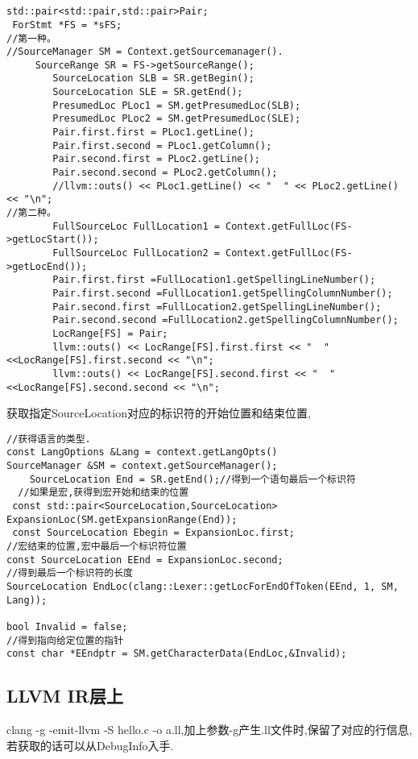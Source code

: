 \section{}

\subsection{}

\begin{lstlisting}
std::pair<std::pair,std::pair>Pair;
 ForStmt *FS = *sFS;
//第一种。
//SourceManager SM = Context.getSourcemanager().
     SourceRange SR = FS->getSourceRange();
        SourceLocation SLB = SR.getBegin();
        SourceLocation SLE = SR.getEnd();
        PresumedLoc PLoc1 = SM.getPresumedLoc(SLB);
        PresumedLoc PLoc2 = SM.getPresumedLoc(SLE);
        Pair.first.first = PLoc1.getLine();
        Pair.first.second = PLoc1.getColumn();
        Pair.second.first = PLoc2.getLine();
        Pair.second.second = PLoc2.getColumn();
        //llvm::outs() << PLoc1.getLine() << "  " << PLoc2.getLine() << "\n";
//第二种。
        FullSourceLoc FullLocation1 = Context.getFullLoc(FS->getLocStart());
        FullSourceLoc FullLocation2 = Context.getFullLoc(FS->getLocEnd());
        Pair.first.first =FullLocation1.getSpellingLineNumber();
        Pair.first.second =FullLocation1.getSpellingColumnNumber();
        Pair.second.first =FullLocation2.getSpellingLineNumber();
        Pair.second.second =FullLocation2.getSpellingColumnNumber();
        LocRange[FS] = Pair;
        llvm::outs() << LocRange[FS].first.first << "  " <<LocRange[FS].first.second << "\n";
        llvm::outs() << LocRange[FS].second.first << "  " <<LocRange[FS].second.second << "\n";
\end{lstlisting}

\par{获取指定SourceLocation对应的标识符的开始位置和结束位置,}
\begin{lstlisting}
//获得语言的类型.
const LangOptions &Lang = context.getLangOpts()
SourceManager &SM = context.getSourceManager();
    SourceLocation End = SR.getEnd();//得到一个语句最后一个标识符
  //如果是宏,获得到宏开始和结束的位置
 const std::pair<SourceLocation,SourceLocation> ExpansionLoc(SM.getExpansionRange(End));
 const SourceLocation Ebegin = ExpansionLoc.first;
//宏结束的位置,宏中最后一个标识符位置
const SourceLocation EEnd = ExpansionLoc.second;
//得到最后一个标识符的长度
SourceLocation EndLoc(clang::Lexer::getLocForEndOfToken(EEnd, 1, SM, Lang));

bool Invalid = false;
//得到指向给定位置的指针
const char *EEndptr = SM.getCharacterData(EndLoc,&Invalid);
\end{lstlisting}

\subsection{LLVM IR层上}

\par{clang -g -emit-llvm -S hello.c -o a.ll,加上参数-g产生.ll文件时,保留了对应的行信息,若获取的话可以从DebugInfo入手.}
